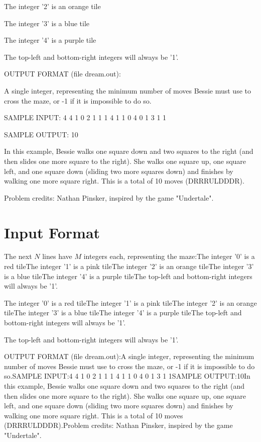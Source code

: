 \documentclass[12pt]{article}
\begin{document}
The integer '2' is an orange tile

The integer '3' is a blue tile

The integer '4' is a purple tile

The top-left and bottom-right integers will always be '1'.


OUTPUT FORMAT (file dream.out):

A single integer, representing the minimum number of moves Bessie must use to
cross the maze, or -1 if it is impossible to do so.


SAMPLE INPUT:
4 4
1 0 2 1
1 1 4 1
1 0 4 0
1 3 1 1

SAMPLE OUTPUT: 
10

In this example, Bessie walks one square down and two squares to the right  (and
then slides one more square to the right). She walks one square up, one square 
left, and one square down (sliding two more squares down) and finishes by
walking one more square right. This is a total of 10 moves (DRRRULDDDR).

Problem credits: Nathan Pinsker, inspired by the game "Undertale".



\section*{Input Format}
The next $N$ lines have $M$ integers each, representing the maze:The integer '0' is a red tileThe integer '1' is a pink tileThe integer '2' is an orange tileThe integer '3' is a blue tileThe integer '4' is a purple tileThe top-left and bottom-right integers will always be '1'.

The integer '0' is a red tileThe integer '1' is a pink tileThe integer '2' is an orange tileThe integer '3' is a blue tileThe integer '4' is a purple tileThe top-left and bottom-right integers will always be '1'.

The top-left and bottom-right integers will always be '1'.

OUTPUT FORMAT (file dream.out):A single integer, representing the minimum number of moves Bessie must use to
cross the maze, or -1 if it is impossible to do so.SAMPLE INPUT:4 4
1 0 2 1
1 1 4 1
1 0 4 0
1 3 1 1SAMPLE OUTPUT:10In this example, Bessie walks one square down and two squares to the right  (and
then slides one more square to the right). She walks one square up, one square 
left, and one square down (sliding two more squares down) and finishes by
walking one more square right. This is a total of 10 moves (DRRRULDDDR).Problem credits: Nathan Pinsker, inspired by the game "Undertale".
\end{document}
